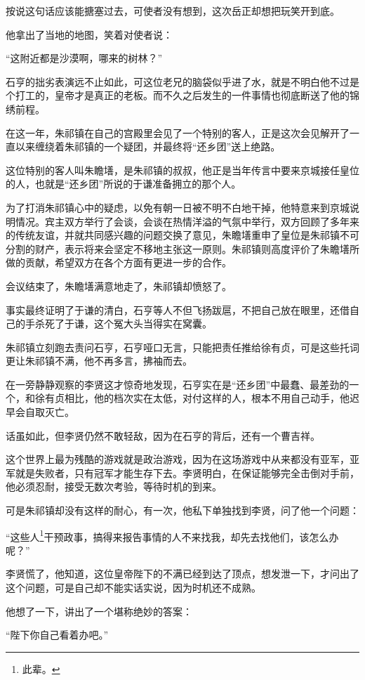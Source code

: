 \begin{multicols}{\theparacolNo}
按说这句话应该能搪塞过去，可使者没有想到，这次岳正却想把玩笑开到底。

他拿出了当地的地图，笑着对使者说：

“这附近都是沙漠啊，哪来的树林？”

石亨的拙劣表演远不止如此，可这位老兄的脑袋似乎进了水，就是不明白他不过是个打工的，皇帝才是真正的老板。而不久之后发生的一件事情也彻底断送了他的锦绣前程。

在这一年，朱祁镇在自己的宫殿里会见了一个特别的客人，正是这次会见解开了一直以来缠绕着朱祁镇的一个疑团，并最终将“还乡团”送上绝路。

这位特别的客人叫朱瞻墡，是朱祁镇的叔叔，他正是当年传言中要来京城接任皇位的人，也就是“还乡团”所说的于谦准备拥立的那个人。

为了打消朱祁镇心中的疑虑，以免有朝一日被不明不白地干掉，他特意来到京城说明情况。宾主双方举行了会谈，会谈在热情洋溢的气氛中举行，双方回顾了多年来的传统友谊，并就共同感兴趣的问题交换了意见，朱瞻墡重申了皇位是朱祁镇不可分割的财产，表示将来会坚定不移地主张这一原则。朱祁镇则高度评价了朱瞻墡所做的贡献，希望双方在各个方面有更进一步的合作。

会议结束了，朱瞻墡满意地走了，朱祁镇却愤怒了。

事实最终证明了于谦的清白，石亨等人不但飞扬跋扈，不把自己放在眼里，还借自己的手杀死了于谦，这个冤大头当得实在窝囊。

朱祁镇立刻跑去责问石亨，石亨哑口无言，只能把责任推给徐有贞，可是这些托词更让朱祁镇不满，他不再多言，拂袖而去。

在一旁静静观察的李贤这才惊奇地发现，石亨实在是“还乡团”中最蠢、最差劲的一个，和徐有贞相比，他的档次实在太低，对付这样的人，根本不用自己动手，他迟早会自取灭亡。

话虽如此，但李贤仍然不敢轻敌，因为在石亨的背后，还有一个曹吉祥。

这个世界上最为残酷的游戏就是政治游戏，因为在这场游戏中从来都没有亚军，亚军就是失败者，只有冠军才能生存下去。李贤明白，在保证能够完全击倒对手前，他必须忍耐，接受无数次考验，等待时机的到来。

可是朱祁镇却没有这样的耐心，有一次，他私下单独找到李贤，问了他一个问题：

“这些人\footnote{此辈。}干预政事，搞得来报告事情的人不来找我，却先去找他们，该怎么办呢？”

李贤慌了，他知道，这位皇帝陛下的不满已经到达了顶点，想发泄一下，才问出了这个问题，可是自己却不能实话实说，因为时机还不成熟。

他想了一下，讲出了一个堪称绝妙的答案：

“陛下你自己看着办吧。”


\end{multicols}
